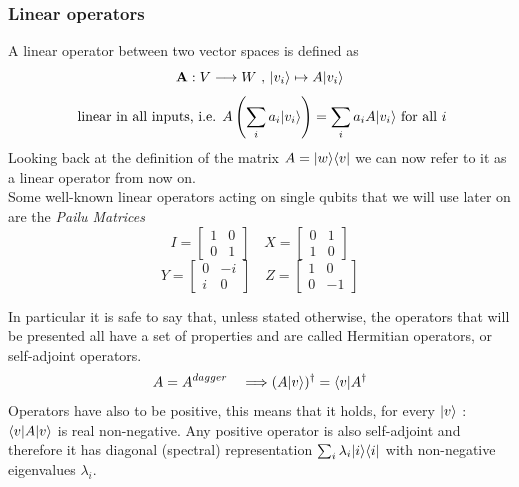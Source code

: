 	\subsubsection*{Linear operators}
	A linear operator between two vector spaces is defined as 
	$$ \mathbf{A}: V\longrightarrow W \text{  ,  }|v_i \rangle\mapsto A|v_i \rangle$$
	$$ \text{ linear in all inputs, i.e.  }  A\left( \sum_i a_i|v_i \rangle\right) = \sum_i a_i A|v_i \rangle \text{  for all } i $$ 
	Looking back at the definition of the matrix $ A = |w \rangle\langle v|$ we can now refer to it as a linear operator from now on. \\
	Some well-known linear operators acting on single qubits that we will use later on are the \textit{Pailu Matrices}
	$$ I = \begin{bmatrix} 1 & 0 \\ 0 & 1 \end{bmatrix}	 \quad   X = \begin{bmatrix} 0 & 1 \\ 1 & 0 \end{bmatrix}$$
	$$ Y= \begin{bmatrix} 0 & -i \\ i & 0 \end{bmatrix}	 \quad   Z = \begin{bmatrix} 1 & 0 \\ 0 & -1 \end{bmatrix}$$
	
	In particular it is safe to say that, unless stated otherwise, the operators that will be presented all have a set of properties and are called Hermitian operators, or self-adjoint operators.\\
	$$ A = A^{dagger} \quad \Longrightarrow (A|v \rangle)^{\dagger} = \langle v|A^{\dagger} $$ 
	Operators have also to be positive, this means that it holds, for every $|v \rangle$ : $\langle v|A|v \rangle$ is real non-negative. Any positive operator is also self-adjoint and therefore it has diagonal (spectral) representation $\sum_i \lambda_i |i\rangle\langle i|$ with non-negative eigenvalues $\lambda_i$.\\
	
